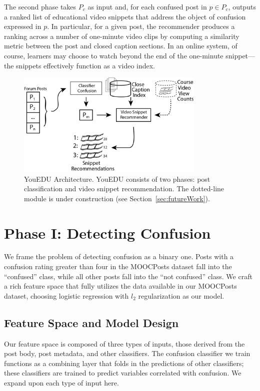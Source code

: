 \documentclass{edm_template}
\begin{document}
The second phase takes $P_{c}$ as input and, for each confused post in $p \in P_{c}$, outputs a ranked list of educational video snippets that address the object of confusion expressed in $p$. In particular, for a given post, the recommender produces a ranking across a number of one-minute video clips by computing a similarity metric between the post and closed caption sections. In an online system, of course, learners may choose to watch beyond the end of the one-minute snippet---the snippets effectively function as a video index.
\begin{figure}[htp]
       \centering
       \includegraphics[width=0.8\textwidth]{../Figs/youEduArch.png}
       \caption{\textnormal{YouEDU Architecture. YouEDU 
           consists of two phases: post classification and video
           snippet recommendation. The dotted-line module is under
           construction (see Section~\ref{sec:futureWork}).}}
       \label{figure:architecture}
\end{figure}

\section{Phase I: Detecting Confusion}
\label{sec:confusionDetection}

We frame the problem of detecting confusion as a binary one. Posts with a confusion rating greater than four in the MOOCPosts dataset fall into the ``confused'' class, while all other posts fall into the ``not confused'' class. We craft a rich feature space that fully utilizes the data available in our MOOCPosts dataset, choosing logistic regression with $l_{2}$ regularization as our model.

\subsection{Feature Space and Model Design}
Our feature space is composed of three types of inputs, those derived from the post body, post metadata, and other classifiers. The confusion classifier we train functions as a combining layer that folds in the predictions of other classifiers; these classifiers are trained to predict variables correlated with confusion. We expand upon each type of input here.
\end{document}
